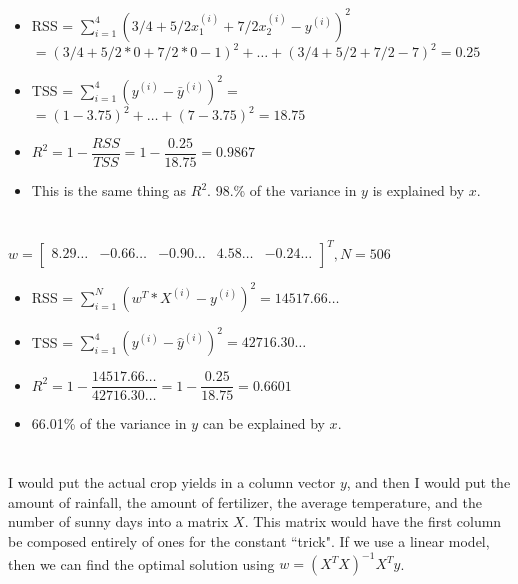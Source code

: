 \documentclass[12pt]{article}
\begin{document}
\begin{itemize}
	\item RSS = $\sum\limits_{i=1}^{4} \left(3/4 + 5/2x_1^{(i)} + 7/2x_2^{(i)} - y^{(i)}\right)^2$ \\
	$=\left(3/4 + 5/2*0 + 7/2*0 - 1\right)^2 + \ldots + \left(3/4 + 5/2 + 7/2 - 7 \right)^2 =0.25$
	
	\item TSS = $\sum\limits_{i=1}^{4} \left(y^{(i)} - \bar{y}^{(i)}\right)^2 =$ \\
	$= \left(1 - 3.75\right)^2 + \ldots + \left(7 - 3.75\right)^2 =18.75$
	
	\item $ R^2 = 1 - \dfrac{RSS}{TSS} = 1 - \dfrac{0.25}{18.75} = 0.9867$
	
	\item This is the same thing as $ R^2 $. 98.\% of the variance in $ y $ is explained by $ x $.
\end{itemize}
\newpage
\section{}
$ w = \begin{bmatrix*}
	8.29\ldots & -0.66\ldots & -0.90\ldots & 4.58\ldots & -0.24\ldots\\
\end{bmatrix*}^T , N = 506$
\begin{itemize}
	\item RSS = $\sum\limits_{i=1}^{N} \left(w^T * X^{(i)} - y^{(i)}\right)^2 = 14517.66\ldots$
	
	\item TSS = $\sum\limits_{i=1}^{4} \left(y^{(i)} - \hat{y}^{(i)}\right)^2 = 42716.30\ldots$
	
	\item $ R^2 = 1 - \dfrac{14517.66\ldots}{42716.30\ldots} = 1 - \dfrac{0.25}{18.75} = 0.6601$
	
	\item 66.01\% of the variance in $ y $ can be explained by $ x $.
\end{itemize}
\newpage
\section{}
I would put the actual crop yields in a column vector $ y $, and then I would put the amount of rainfall, the amount of fertilizer, the average temperature, and the number of sunny days into a matrix $ X $. This matrix would have the first column be composed entirely of ones for the constant ``trick". If we use a linear model, then we can find the optimal solution using $ w = (X^TX)^{-1}X^Ty $.
\newpage
\end{document}
